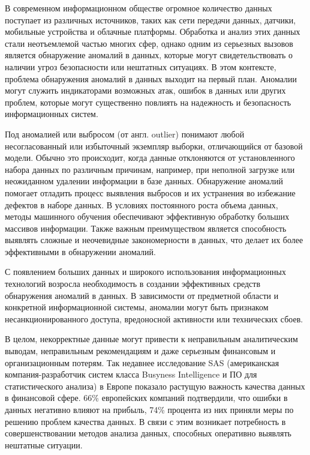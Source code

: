 \introduction

В современном информационном обществе огромное количество данных поступает из различных источников, таких как сети передачи данных, датчики, мобильные устройства и облачные платформы. Обработка и анализ этих данных стали неотъемлемой частью многих сфер, однако одним из серьезных вызовов является обнаружение аномалий в данных, которые могут свидетельствовать о наличии угроз безопасности или нештатных ситуациях. В этом контексте, проблема обнаружения аномалий в данных выходит на первый план. Аномалии могут служить индикаторами возможных атак, ошибок в данных или других проблем, которые могут существенно повлиять на надежность и безопасность информационных систем.

Под аномалией или выбросом (от англ. outlier) \cite{What-is-anomalies} понимают любой несогласованный или избыточный экземпляр выборки, отличающийся от базовой модели. Обычно это происходит, когда данные отклоняются от установленного набора данных по различным причинам, например, при неполной загрузке или неожиданном удалении информации в базе данных. Обнаружение аномалий помогает отладить процесс выявления выбросов и их устранения во избежание дефектов в наборе данных.
В условиях постоянного роста объема данных, методы машинного обучения \cite{Outliers-in-data} обеспечивают эффективную обработку больших массивов информации. Также важным преимуществом является способность выявлять сложные и неочевидные закономерности в данных, что делает их более эффективными в обнаружении аномалий.

С появлением больших данных и широкого использования информационных технологий возросла необходимость в создании эффективных \cite{AI-and-ML-for-AD} средств обнаружения аномалий в данных. В зависимости от предметной области и конкретной информационной системы, аномалии могут быть признаком несанкционированного доступа, вредоносной активности или технических сбоев.

В целом, некорректные данные могут привести к неправильным аналитическим выводам, неправильным рекомендациям и даже серьезным финансовым и организационным потерям. Так недавнее исследование SAS (американская компания-разработчик систем класса Busyness Intelligence и ПО для статистического анализа) \cite{SAS-Data-Quality} в Европе показало растущую важность качества данных в финансовой сфере. 66\% европейских компаний подтвердили, что ошибки в данных негативно влияют на прибыль, 74\% процента из них приняли меры по решению проблем качества данных. В связи с этим возникает потребность в совершенствовании методов анализа данных, способных оперативно выявлять нештатные ситуации.

